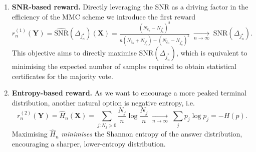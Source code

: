 \begin{enumerate}[label=(\roman*)]
\item \textbf{SNR-based reward.}
Directly leveraging the SNR as a driving factor in the efficiency of the MMC scheme we introduce the first reward
\begin{equation}\label{eq:snr_based_reward}
r^{(1)}_n(\mathbf{Y})
=\widehat{\mathrm{SNR}}(\Delta_{j^\star_n})(\mathbf{X})
=\tfrac{(N_{\widehat c_n}-N_{j^\star_n})^{2}}
       {n\left(N_{\widehat c_n}+N_{j^\star_n}\right)
        -(N_{\widehat c_n}-N_{j^\star_n})^{2}}
\;\xrightarrow[n\to\infty]{}\;
\mathrm{SNR}(\Delta_{j^\star_n}).
\end{equation}
This objective aims to directly maximise \(\text{SNR}(\Delta_{j_n^*})\), which is equivalent to minimising the expected
number of samples required to obtain statistical certificates for the majority vote. 

\item \textbf{Entropy-based reward.}
As we want to encourage a more peaked terminal distribution, another natural option is negative entropy, i.e.
\begin{equation}\label{eq:entropy_based_reward}
r^{(2)}_n(\mathbf{Y})
=\widehat H_n(\mathbf{X})
=\sum_{j:N_j>0}\frac{N_j}{n}\log\frac{N_j}{n}
\;\xrightarrow[n\to\infty]{}\;
\sum_j p_j\log p_j=-H(p).
\end{equation}
Maximising \( \widehat H_n \)  \emph{minimises} the Shannon entropy of the answer
distribution, encouraging a sharper, lower-entropy distribution.
\end{enumerate}

